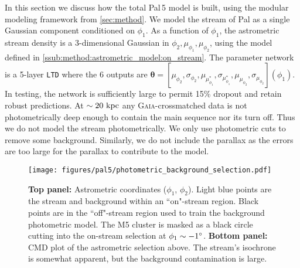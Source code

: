 \documentclass[twocolumn]{aastex631}
\newcommand{\code}[1]{\textsc{#1}}
\newcommand{\package}[1]{\code{#1}}
\newcommand{\stream}[1]{#1}
\newcommand{\mbs}[1]{\boldsymbol{#1}}
\begin{document}
        In this section we discuss how the total \stream{Pal\,5} model is built,
        using the modular modeling framework from \autoref{sec:method}.  We
        model the stream of \stream{Pal} as a single Gaussian component
        conditioned on $\phi_1$. As a function of $\phi_1$, the astrometric
        stream density is a 3-dimensional Gaussian in $\phi_2, \mu_{\phi_1},
        \mu_{\phi_2}$, using the model defined in
        \autoref{ssub:method:astrometric_model:on_stream}.  The parameter
        network is a 5-layer \texttt{LTD} where the 6 outputs are $\mbs{\theta}
        = [\mu_{\phi_2}, \sigma_{\phi_2}, \mu_{\mu_{\phi_1}^*},
        \sigma_{\mu_{\phi_1}^*}, \mu_{\mu_{\phi_2}},
        \sigma_{\mu_{\phi_2}}](\phi_1)$.  In testing, the network is
        sufficiently large to permit 15\% dropout and retain robust predictions.
        At $\sim 20 \ \rm{kpc}$ any \package{Gaia}-crossmatched data is not
        photometrically deep enough to contain the main sequence nor its turn
        off. Thus we do not model the stream photometrically. We only use
        photometric cuts to remove some background. Similarly, we do not include
        the parallax as the errors are too large for the parallax to contribute
        to the model. 

        \begin{figure}[ht]
            \centering
            \texttt{[image: figures/pal5/photometric\_background\_selection.pdf]}
            \caption{%
                \textbf{Top panel:} Astrometric coordinates ($\phi_1$,
                $\phi_2$).  Light blue points are the stream and background
                within an ``on"-stream region. Black points are in the
                ``off"-stream region used to train the background photometric
                model. The \stream{M5} cluster is masked as a black circle
                cutting into the on-stream selection at $\phi_1\sim-1\degree$.
                \textbf{Bottom panel:} CMD plot of the astrometric selection
                above. The stream's isochrone is somewhat apparent, but the
                background contamination is large.
            }
            \label{fig:pal5-photometric_background_selection}
        \end{figure}
        
\end{document}
